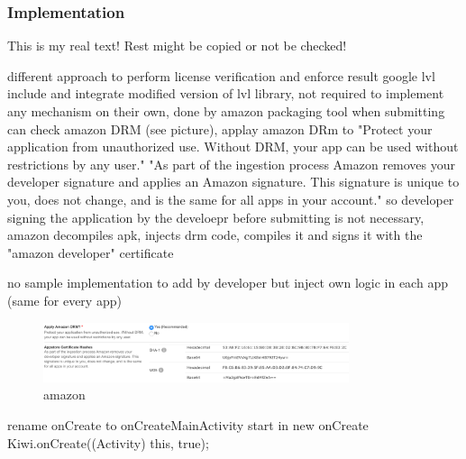\subsubsection{Implementation}\label{subsection:license-amazon-implementation}
This is my real text! Rest might be copied or not be checked!

%
different approach to perform license verification and enforce result
google lvl include and integrate modified version of lvl library, not required to implement any mechanism on their own, done by amazon packaging tool
when submitting can check amazon DRM (see picture), applay amazon DRm to "Protect your application from unauthorized use. Without DRM, your app can be used without restrictions by any user."
"As part of the ingestion process Amazon removes your developer signature and applies an Amazon signature. This signature is unique to you, does not change, and is the same for all apps in your account." so developer signing the application by the develoepr before submitting is not necessary, amazon decompiles apk, injects drm code, compiles it and signs it with the "amazon developer" certificate

no sample implementation to add by developer but inject own logic in each app (same for every app)
\cite{munteanLicense}
%

\begin{figure}[h]
    \centering
    \includegraphics[width=0.8\textwidth]{data/amazon.png}
    \caption{amazon}
    \label{fig:amazon}
\end{figure}




rename onCreate to onCreateMainActivity
start in new onCreate         Kiwi.onCreate((Activity) this, true);
